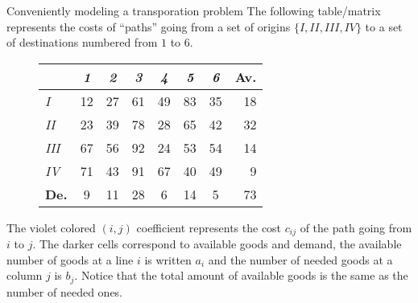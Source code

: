 \documentclass[32pt,aspectratio=169]{beamer}
\begin{document}
\begin{frame}{Conveniently modeling a transporation problem}
  The following table/matrix represents the costs of ``paths'' going
  from a set of origins $\{I, II, III, IV\}$ to a set of destinations
  numbered from $1$ to $6$. 
  \begin{figure}
    \begin{tabular}{l|c|c|c|c|c|c|r}
      & \textit{1} & \textit{2} & \textit{3} & \textit{4} & \textit{5} & \textit{6} & \cellcolor{blue!50}\textbf{Av.}\\
      \hline
      \textit{I} & \cellcolor{blue!25}12 & \cellcolor{blue!25}27 & \cellcolor{blue!25}61 & \cellcolor{blue!25}49 & \cellcolor{blue!25}83 & \cellcolor{blue!25}35 & \cellcolor{blue!50}18  \\
      \hline 
      \textit{II} & \cellcolor{blue!25}23 & \cellcolor{blue!25}39 & \cellcolor{blue!25}78 & \cellcolor{blue!25}28 & \cellcolor{blue!25}65 & \cellcolor{blue!25}42 & \cellcolor{blue!50}32  \\
      \hline
      \textit{III} & \cellcolor{blue!25}67 & \cellcolor{blue!25}56 & \cellcolor{blue!25}92 & \cellcolor{blue!25}24 & \cellcolor{blue!25}53 & \cellcolor{blue!25}54 & \cellcolor{blue!50}14  \\
      \hline
      \textit{IV} & \cellcolor{blue!25}71 & \cellcolor{blue!25}43 & \cellcolor{blue!25}91 & \cellcolor{blue!25}67 & \cellcolor{blue!25}40 & \cellcolor{blue!25}49 & \cellcolor{blue!50}9 \\
      \hline 
      \cellcolor{blue!50}\textbf{De.} & \cellcolor{blue!50}9 & \cellcolor{blue!50}11 & \cellcolor{blue!50}28 & \cellcolor{blue!50}6 & \cellcolor{blue!50}14 & \cellcolor{blue!50}5 & \cellcolor{blue!60}73 \\
  \end{tabular}
\end{figure}
\pause The violet colored $(i, j)$ coefficient represents the cost
$c_{ij}$ of the path going from $i$ to $j$. The darker cells
correspond to available goods and demand, the available number of
goods at a line $i$ is written $a_i$ and the number of needed goods at
a column $j$ is $b_j$. Notice that the total amount of available goods
is the same as the number of needed ones.
\end{frame}
\end{document}
